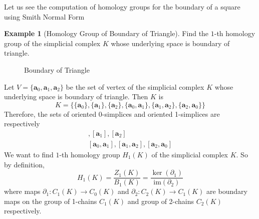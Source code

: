 \documentclass[12pt,oneside,reqno]{amsart}
\theoremstyle{plain}
\theoremstyle{definition}
\newtheorem{example}{Example}[section]
\theoremstyle{remark}
\newcommand{\mrm}[1]{\mathrm{#1}}
\newcommand{\0}{{\textbf{0}}}
\begin{document}
Let us see the computation of homology groups for the boundary of a square using Smith Normal Form

\begin{example}[Homology Group of Boundary of Triangle]\label{eg:Homology Group of Boundary of Triangle}
Find the $1$-th homology group of the simplicial complex $K$ whose underlying space is boundary of triangle.  

\begin{figure}[h!]
    \centering
    \caption{Boundary of Triangle}
    \label{fig:Boundary of Triangle}
\end{figure}
Let $V = \{\bm{a}_0, \bm{a}_1,\bm{a}_2\}$ be the set of vertex of the simplicial complex $K$ whose underlying space is boundary of triangle. Then $K$ is 
\[K = \{\{\bm{a}_0\}, \{\bm{a}_1\}, \{\bm{a}_2\}, \{\bm{a}_0, \bm{a}_1\}, \{\bm{a}_1,\bm{a}_2\}, \{\bm{a}_2,\bm{a}_0\}\}\]
Therefore, the sets of oriented 0-simplices and oriented 1-simplices are respectively
\begin{gather*}
[\bm{a}_0], [\bm{a}_1], [\bm{a}_2] \\
[\bm{a}_0, \bm{a}_1], [\bm{a}_1, \bm{a}_2], [\bm{a}_2, \bm{a}_0]
\end{gather*}
We want to find $1$-th homology group $H_{1}(K)$ of the simplicial complex $K$. So by definition, 
\begin{equation}\label{eq:1 th homology group}
H_{1}(K) = \dfrac{Z_{1}(K)}{B_{1}(K)} = \dfrac{\ker(\partial_1)}{\mrm{im}(\partial_2)}
\end{equation}
where maps $\partial_1 \colon C_{1}(K) \to C_{0}(K)$ and $\partial_2 \colon C_{2}(K) \to C_{1}(K)$ are boundary maps on the group of 1-chains $C_{1}(K)$ and  group of 2-chains $C_{2}(K)$ respectively. 


\end{example}
\end{document}
